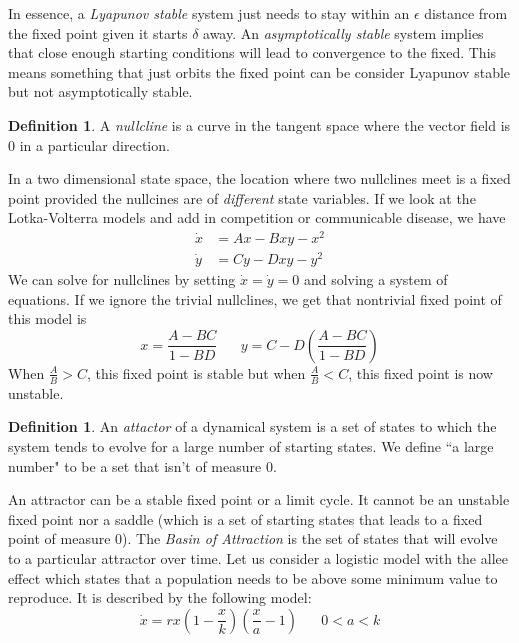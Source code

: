 \documentclass{article}
\theoremstyle{definition}
\newtheorem{definition}[theorem]{Definition}
\begin{document}
In essence, a \emph{Lyapunov stable} system just needs to stay within an $\epsilon$ distance from the fixed point given it starts $\delta$ away. An \emph{asymptotically stable} system implies that close enough starting conditions will lead to convergence to the fixed. This means something that just orbits the fixed point can be consider Lyapunov stable but not asymptotically stable.
\begin{definition}
    A \emph{nullcline} is a curve in the tangent space where the vector field is 0 in a particular direction.
\end{definition}
In a two dimensional state space, the location where two nullclines meet is a fixed point provided the nullcines are of \emph{different} state variables. If we look at the Lotka-Volterra models and add in competition or communicable disease, we have 
\begin{equation*}
    \begin{split}
        \dot x&=Ax-Bxy-x^2 \\
        \dot y&= Cy-Dxy-y^2
    \end{split}
\end{equation*}
We can solve for nullclines by setting $\dot x=\dot y=0$ and solving a system of equations. If we ignore the trivial nullclines, we get that nontrivial fixed point of this model is 
\begin{equation*}
    x=\frac{A-BC}{1-BD} \hspace{20pt} y=C-D\left(\frac{A-BC}{1-BD} \right)
\end{equation*}
When $\frac{A}{B}>C$, this fixed point is stable but when $\frac{A}{B}<C$, this fixed point is now unstable.
\begin{definition}
    An \emph{attactor} of a dynamical system is a set of states to which the system tends to evolve for a large number of starting states. We define ``a large number" to be a set that isn't of measure $0$.
\end{definition}
An attractor can be a stable fixed point or a limit cycle. It cannot be an unstable fixed point nor a saddle (which is a set of starting states that leads to a fixed point of measure 0). The \emph{Basin of Attraction} is the set of states that will evolve to a particular attractor over time. Let us consider a logistic model with the allee effect which states that a population needs to be above some minimum value to reproduce. It is described by the following model: 
\begin{equation*}
    \dot x =rx\left(1-\frac{x}{k}\right)\left(\frac{x}{a}-1\right) \hspace{20pt} 0<a<k
\end{equation*}
\end{document}

